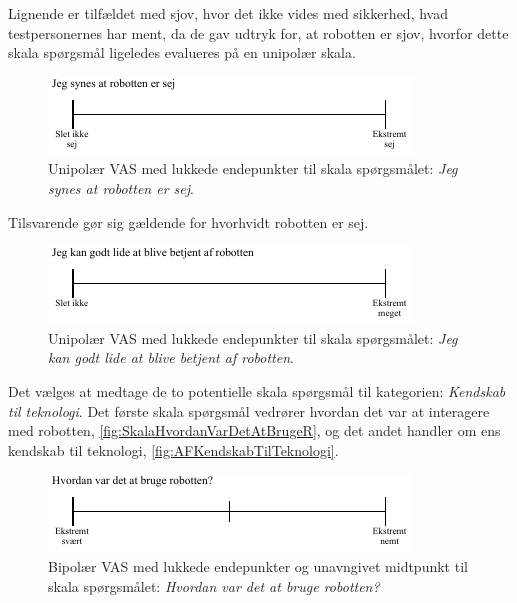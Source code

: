 \noindent
%
Lignende er tilfældet med sjov, hvor det ikke vides med sikkerhed, hvad testpersonernes har ment, da de gav udtryk for, at robotten er sjov, hvorfor dette skala spørgsmål ligeledes evalueres på en unipolær skala. 
%
\begin{figure}[H]
\centering
\includegraphics[width =\textwidth]{Figure/UdvalgteSkalaer/SejR} 
\caption{Unipolær VAS med lukkede endepunkter til skala spørgsmålet: \textit{Jeg synes at robotten er sej}.}
\label{fig:SkalaSejR}
\end{figure}
\noindent
%
Tilsvarende gør sig gældende for hvorhvidt robotten er sej. 
%
\begin{figure}[H]
\centering
\includegraphics[width =\textwidth]{Figure/UdvalgteSkalaer/BetjeningAfR} 
\caption{Unipolær VAS med lukkede endepunkter til skala spørgsmålet: \textit{Jeg kan godt lide at blive betjent af robotten}.}
\label{fig:SkalaBetjeningAfR}
\end{figure}
\noindent
%
Det vælges at medtage de to potentielle skala spørgsmål til kategorien: \textit{Kendskab til teknologi}. Det første skala spørgsmål vedrører hvordan det var at interagere med robotten, \autoref{fig:SkalaHvordanVarDetAtBrugeR}, og det andet handler om ens kendskab til teknologi, \autoref{fig:AFKendskabTilTeknologi}.
%
\begin{figure}[H]
\centering
\includegraphics[width =\textwidth]{Figure/UdvalgteSkalaer/HvordanVarDetAtBrugeR} 
\caption{Bipolær VAS med lukkede endepunkter og unavngivet midtpunkt til skala spørgsmålet: \textit{Hvordan var det at bruge robotten?}}
\label{fig:SkalaHvordanVarDetAtBrugeR}
\end{figure}
